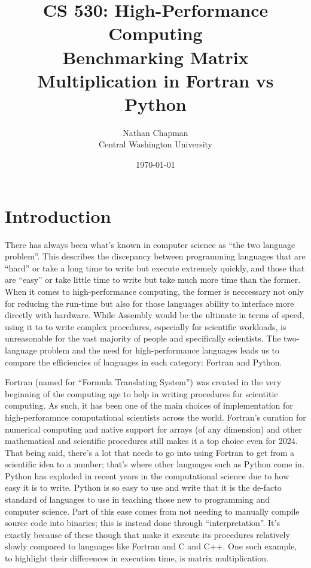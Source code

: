 \documentclass{article}
\title{\Large \vspace{-0.625in} CS 530: High-Performance Computing \\ Benchmarking Matrix Multiplication in Fortran vs Python \vspace{-0.35in}}
\author{Nathan Chapman \vspace{-0.15in} \\ {\normalsize Central Washington University}}
\date{\normalsize \vspace{-0.15in}\today}
\begin{document}
\maketitle

    

\tableofcontents


\section{Introduction}

    There has always been what's known in computer science as ``the two language problem''.  This describes the discepancy between programming languages that are ``hard'' or take a long time to write but execute extremely quickly, and those that are ``easy'' or take little time to write but take much more time than the former.  When it comes to high-performance computing, the former is neccessary not only for reducing the run-time but also for those languages ability to interface more directly with hardware.  While Assembly would be the ultimate in terms of speed, using it to to write complex procedures, especially for scientific workloads, is unreasonable for the vast majority of people and specifically scientists.  The two-language problem and the need for high-performance languages leads us to compare the efficiencies of languages in each category: Fortran and Python.

    Fortran (named for ``Formula Translating System'') was created in the very beginning of the computing age to help in writing procedures for scientitic computing.  As such, it has been one of the main choices of implementation for high-perforamnce computational scientists across the world.  Fortran's curation for numerical computing and native support for arrays (of any dimension) and other mathematical and scientific procedures still makes it a top choice even for 2024.  That being said, there's a lot that needs to go into using Fortran to get from a scientific idea to a number;  that's where other languages such as Python come in.
\pagebreak
    Python has exploded in recent years in the computational science due to how easy it is to write.  Python is so easy to use and write that it is the de-facto standard of languages to use in teaching those new to programming and computer science.  Part of this ease comes from not needing to manually compile source code into binaries; this is instead done through ``interpretation''.  It's exactly because of these though that make it execute its procedures relatively slowly compared to languages like Fortran and C and C++.  One such example, to highlight their differences in execution time, is matrix multiplication.
\end{document}
